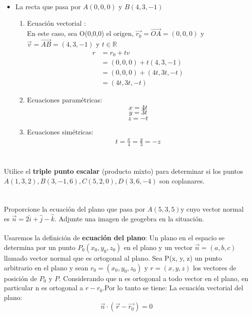 \documentclass[12pt]{article}
\begin{document}
\begin{itemize}
\begin {itemize}
\item La recta que pasa por $A(0,0,0)$ y $B(4,3,-1)$
\begin{enumerate}
\item Ecuación vectorial :\\
  En este caso, sea O(0,0,0) el origen,  $\vec{r_0} = \vec{OA} = (0, 0, 0)$  y  $\vec{v} = \vec{AB}= (4,3,-1)$ y $t \in \mathds{R} $
     \begin{equation*}
  \begin{split}
    r &= r_0 + tv \\
    &= (0, 0, 0)  + t(4,3,-1) \\
    &= (0, 0, 0)  + (4t,3t,-t)\\
    &= (4t,3t,-t)
  \end{split}
     \end{equation*}
   \item Ecuaciones paramétricas:
     $$x = 4t $$
     $$y = 3t$$
     $$z =  -t $$
   \item Ecuaciones simétricas:
      \begin{equation*}
      \begin{split}
        t = \frac{x}{4} = \frac{y}{3} = -z
      \end{split}
       \end{equation*}
\end{enumerate}
\end{itemize}
\section{}

Utilice el \textbf{triple punto escalar} (producto mixto) para determinar si los puntos $A(1,3,2) , B(3,-1,6), C(5,2,0), D(3,6,-4)$ son coplanares.

\section{}

Proporcione la ecuación del plano que pasa por $A(5,3,5)$y cuyo vector normal es $\vec{n}=2\hat{i} + \hat{j} - \hat{k}$. Adjunte una imagen de geogebra en la situación.\\ \\
Usaremos la definición de \textbf{ecuación del plano}:
Un plano en el espacio se determina por un punto $P_0(x_0, y_0, z_0)$ en el plano y un vector $\vec{n}=(a,b,c)$ llamado vector normal que es ortogonal al plano. Sea P(x, y, z) un punto arbitrario en el plano y sean $r_0 = (x_0, y_0, z_0)$ y $r = (x, y,z)$ los vectores de posición de $P_0$ y $P$. Considerando que n es ortogonal a todo vector en el plano, en particular n es ortogonal a $r-r_0$.Por lo tanto se tiene:
La ecuación vectorial del plano:
\[
\vec{n} \cdot (\vec{r} - \vec{r_0}) = 0
\]


\end{itemize}
\end{document}
